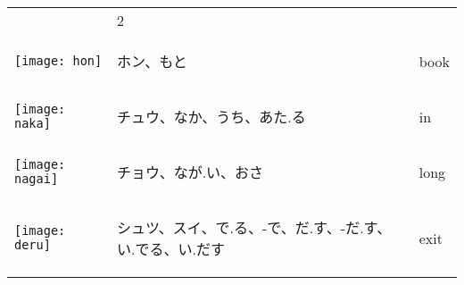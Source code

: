 \documentclass[a4paper,12pt]{extarticle}
\begin{document}
\begin{longtable}{|lp{6cm}p{4cm}|}
	                                   &
	2
	\\
	\begin{minipage}{0.3\textwidth}
		\centerline{
			\texttt{[image: hon]}
		}
	\end{minipage}
	                                   &
	\begin{CJK}{UTF8}{min}ホン、もと\end{CJK}
	                                   &
	book
	\\
	\begin{minipage}{0.3\textwidth}
		\centerline{
			\texttt{[image: naka]}
		}
	\end{minipage}
	                                   &
	\begin{CJK}{UTF8}{min}チュウ、なか、うち、あた.る\end{CJK}
	                                   &
	in
	\\
	\begin{minipage}{0.3\textwidth}
		\centerline{
			\texttt{[image: nagai]}
		}
	\end{minipage}
	                                   &
	\begin{CJK}{UTF8}{min}チョウ、なが.い、おさ\end{CJK}
	                                   &
	long
	\\
	\begin{minipage}{0.3\textwidth}
		\centerline{
			\texttt{[image: deru]}
		}
	\end{minipage}
	                                   &
	\begin{CJK}{UTF8}{min}シュツ、スイ、で.る、-で、だ.す、-だ.す、い.でる、い.だす\end{CJK}
	                                   &
	exit
	\\

\end{longtable}
\end{document}
